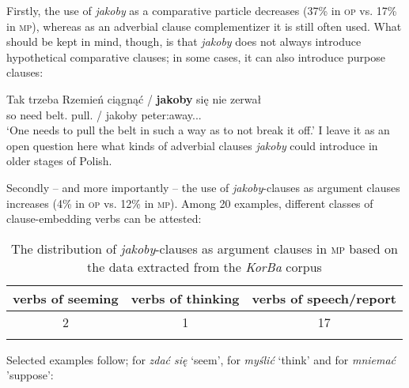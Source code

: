 \documentclass[output=paper
,modfonts
,nonflat]{langsci/langscibook}
\begin{document}
Firstly, the use of \emph{jakoby} as a comparative particle decreases (37\% in \textsc{op} vs. 17\% in \textsc{mp}), whereas as an adverbial clause complementizer it is still often used. What should be kept in mind, though, is that \emph{jakoby} does not always introduce hypothetical comparative clauses; in some cases, it can also introduce purpose clauses:

\ea \gll Tak trzeba Rzemień ciągnąć / \textbf{jakoby} się nie zerwał \\
		so need belt.{\acc} pull.{\infv} / jakoby {} {\negation} peter:away.{\lptcp}.{\sg}.{\masc} \\
\glt	`One needs to pull the belt in such a way as to not break it off.' 
\z
I leave it as an open question here what kinds of adverbial clauses \emph{jakoby} could introduce in older stages of Polish.

Secondly – and more importantly – the use of \emph{jakoby}-clauses as argument clauses increases (4\% in \textsc{op} vs. 12\% in \textsc{mp}). Among 20 examples, different classes of clause-embedding verbs can be attested:

 \begin{table}[h]  \begin{tabular}{ccc}
\lsptoprule
verbs of seeming & verbs of thinking & verbs of speech\slash report \\
\midrule
2 & 1 & 17  \\
 \lspbottomrule
\end{tabular}
\caption{The distribution of \emph{jakoby}-clauses as argument clauses in \textsc{mp} based on the data extracted from the \emph{KorBa} corpus}
\end{table}

\noindent Selected examples follow;  for \emph{zdać się} `seem',  for \emph{myślić} `think' and  for \emph{mniemać} 'suppose':
\end{document}
